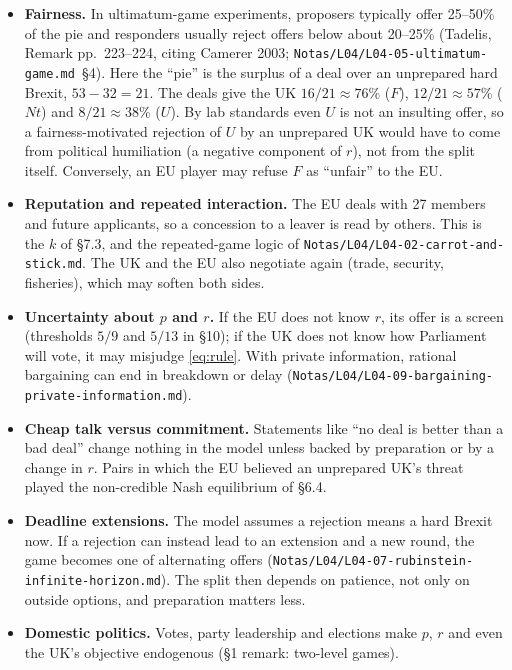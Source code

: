 \documentclass[11pt,a4paper]{article}
\newcommand{\Nt}{\mathit{Nt}}
\newcommand{\dF}{\mathit{F}}
\newcommand{\dU}{\mathit{U}}
\begin{document}
\begin{itemize}
  \item \textbf{Fairness.} In ultimatum-game experiments, proposers typically offer 25--50\% of the
    pie and responders usually reject offers below about 20--25\% (Tadelis, Remark pp.~223--224,
    citing Camerer 2003; \texttt{Notas/L04/L04-05-ultimatum-game.md}~\S4). Here the ``pie'' is the
    surplus of a deal over an unprepared hard Brexit, $53-32=21$. The deals give the UK
    $16/21\approx76\%$ ($\dF$), $12/21\approx57\%$ ($\Nt$) and $8/21\approx38\%$ ($\dU$). By lab
    standards even $\dU$ is not an insulting offer, so a fairness-motivated rejection of $\dU$ by an
    unprepared UK would have to come from political humiliation (a negative component of $r$),
    not from the split itself. Conversely, an EU player may refuse $\dF$ as ``unfair'' to the EU.
  \item \textbf{Reputation and repeated interaction.} The EU deals with 27 members and future
    applicants, so a concession to a leaver is read by others. This is the $k$ of \S7.3, and the
    repeated-game logic of \texttt{Notas/L04/L04-02-carrot-and-stick.md}. The UK and the EU also
    negotiate again (trade, security, fisheries), which may soften both sides.
  \item \textbf{Uncertainty about $p$ and $r$.} If the EU does not know $r$, its offer is a screen
    (thresholds $5/9$ and $5/13$ in \S10); if the UK does not know how Parliament will vote, it may
    misjudge \eqref{eq:rule}. With private information, rational bargaining can end in breakdown
    or delay (\texttt{Notas/L04/L04-09-bargaining-private-information.md}).
  \item \textbf{Cheap talk versus commitment.} Statements like ``no deal is better than a bad deal''
    change nothing in the model unless backed by preparation or by a change in $r$. Pairs in which
    the EU believed an unprepared UK's threat played the non-credible Nash equilibrium of \S6.4.
  \item \textbf{Deadline extensions.} The model assumes a rejection means a hard Brexit now. If a
    rejection can instead lead to an extension and a new round, the game becomes one of
    alternating offers (\texttt{Notas/L04/L04-07-rubinstein-infinite-horizon.md}). The split then
    depends on patience, not only on outside options, and preparation matters less.
  \item \textbf{Domestic politics.} Votes, party leadership and elections make $p$, $r$ and even
    the UK's objective endogenous (\S1 remark: two-level games).
\end{itemize}
\end{document}
